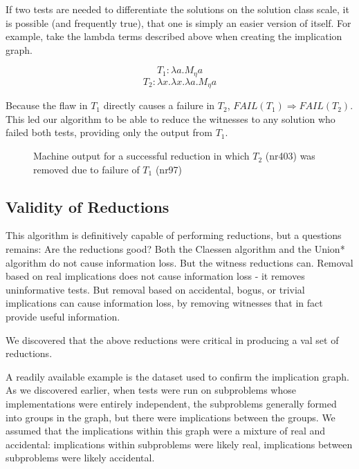 \documentclass[11pt,twoside]{article}
\newcommand\fail{\mathit{FAIL}}
\theoremstyle{definition}
\begin{document}
If two tests are needed to differentiate the solutions on the solution class scale, it is possible (and frequently true), that one is simply an easier version of itself. For example, take the lambda terms described above when creating the implication graph. 

$$T_1 : \lambda a.M_\eta a$$
$$T_2 : \lambda x.\lambda x.\lambda a.M_\eta a$$

Because the flaw in $T_1$ directly causes a failure in $T_2$, $\fail(T_1) \Rightarrow \fail(T_2)$. This led our algorithm to be able to reduce the witnesses to any solution who failed both tests, providing only the output from $T_1$.

\begin{figure}

\caption{Machine output for a successful reduction in which $T_2$ (nr403) was removed due to failure of $T_1$ (nr97)}
\end{figure}

\subsection{Validity of Reductions}

This algorithm is definitively  capable of performing reductions, but a questions remains: Are the reductions good? Both the Claessen algorithm and the Union* algorithm do not cause information loss. But the witness reductions can. Removal based on real implications does not cause information loss - it removes uninformative tests. But removal based on accidental, bogus, or trivial implications can cause information loss, by removing witnesses that in fact provide useful information.

We discovered that the above reductions were critical in producing a val set of reductions.

A readily available example is the dataset used to confirm the implication graph. As we discovered earlier, when tests were run on subproblems whose implementations were entirely independent, the subproblems generally formed into groups in the  graph, but there were implications between the groups. We assumed that the implications within this graph were a mixture of real and accidental: implications within subproblems were likely real, implications between subproblems were likely accidental. 

\end{document}
